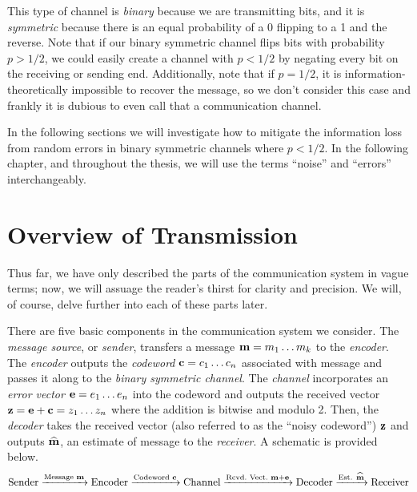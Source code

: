 \documentclass[12pt,twoside]{reedthesis}
\theoremstyle{definition}
\newlength{\arrow}
\begin{document}
This type of channel is \textit{binary} because we are transmitting bits, and it is \textit{symmetric} because there is an equal probability of a 0 flipping to a 1 and the reverse. Note that if our binary symmetric channel flips bits with probability $p > 1/2$, we could easily create a channel with $p <1/2$ by negating every bit on the receiving or sending end. Additionally, note that if $p=1/2$, it is  information-theoretically impossible to recover the message, so we don't consider this case and frankly it is dubious to even call that a communication channel.

In the following sections we will investigate how to mitigate the information loss from random errors in binary symmetric channels where $p<1/2$. In the following chapter, and throughout the thesis, we will use the terms ``noise'' and ``errors'' interchangeably.

\section{Overview of Transmission}

Thus far, we have only described the parts of the communication system in vague terms; now, we will assuage the reader's thirst for clarity and precision. We will, of course, delve further into each of these parts later.

There are five basic components in the communication system we consider. The \textit{message source}, or \textit{sender}, transfers a message $\mathbf{m} = m_{1} \ldots m_{k}$ to the \textit{encoder}. The \textit{encoder} outputs the \textit{codeword} $\mathbf{c} = c_{1}\ldots c_{n}$ associated with message \mess and passes it along to the \textit{binary symmetric channel}. The \textit{channel} incorporates an \textit{error vector} $\mathbf{e} = e_{1} \ldots e_{n}$ into the codeword and outputs the received vector $\mathbf{z} = \mathbf{e} + \mathbf{c} = z_{1} \ldots z_{n}$ where the addition is bitwise and modulo 2. Then, the \textit{decoder} takes the received vector (also referred to as the ``noisy codeword'') $\mathbf{z}$ and outputs $\widehat{\mathbf{m}}$, an estimate of message \mess to the \textit{receiver}. A schematic is provided below.
\begin{equation*}
\text{Sender} \xrightarrow{\text{Message }\mathbf{m}} \text{Encoder} \xrightarrow{\text{Codeword }\mathbf{c}} \text{Channel} \xrightarrow{\text{Rcvd.~Vect.~}\mathbf{m}+\mathbf{e}} \text{Decoder} \xrightarrow{\text{Est. }\widehat{\mathbf{m}}} \text{Receiver}
\end{equation*}
\end{document}
